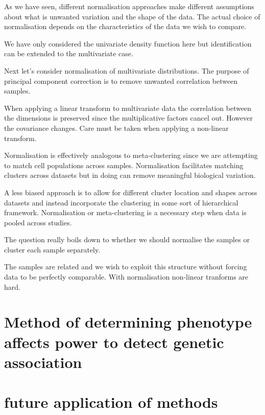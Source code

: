 As we have seen, different normalisation approaches make different assumptions about what is unwanted variation and the shape of the data.
The actual choice of normalisation depends on the characteristics of the data we wish to compare.

We have only considered the univariate density function here but identification can be extended to the multivariate case.

Next let's consider normalisation of multivariate distributions.  
The purpose of principal component correction is to remove unwanted correlation between samples.

When applying a linear transform to multivariate data the correlation between the dimensions is preserved since the multiplicative factors cancel out.
However the covariance changes.
Care must be taken when applying a non-linear transform.  

Normalisation is effectively analogous to meta-clustering since we are attempting to match cell populations across samples.  
Normalisation facilitates matching clusters across datasets but in doing can remove meaningful biological variation.  


A less biased approach is to allow for different cluster location and shapes across datasets and instead incorporate the clustering in some sort of hierarchical framework.  
Normalisation or meta-clustering is a necessary step when data is pooled across studies.




The question really boils down to whether we should normalise the samples or cluster each sample separately.

The samples are related and we wish to exploit this structure without forcing data to be perfectly comparable.
With normalisation non-linear tranforms are hard.






\section{ Method of determining phenotype affects power to detect genetic association }

\section{ future application of methods }


